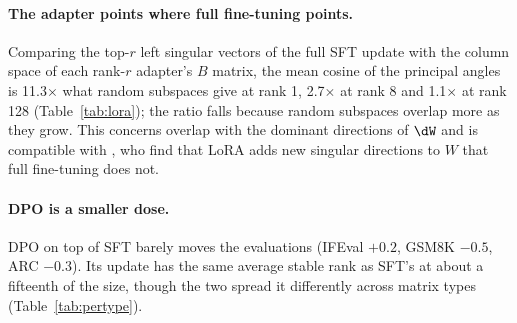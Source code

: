 \paragraph{The adapter points where full fine-tuning points.} Comparing the
top-$r$ left singular vectors of the full SFT update with the column space of
each rank-$r$ adapter's $B$ matrix, the mean cosine of the principal angles is
11.3$\times$ what random subspaces give at rank 1, 2.7$\times$ at rank 8 and
1.1$\times$ at rank 128 (Table~\ref{tab:lora}); the ratio falls because random
subspaces overlap more as they grow. This concerns overlap with the dominant
directions of $\dW$ and is compatible with \citet{shuttleworth2025lora}, who
find that LoRA adds new singular directions to $W$ that full fine-tuning does
not.

\paragraph{DPO is a smaller dose.} DPO on top of SFT barely moves the
evaluations (IFEval $+0.2$, GSM8K $-0.5$, ARC $-0.3$). Its update has the same
average stable rank as SFT's at about a fifteenth of the size, though the two
spread it differently across matrix types (Table~\ref{tab:pertype}).
